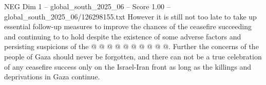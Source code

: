 \begin{textsample}{NEG Dim 1 – global\_south\_2025\_06 – Score 1.00 – global\_south\_2025\_06/126298155.txt}
However it is still not too late to take up essential follow-up measures to improve the chances of the ceasefire succeeding and continuing to to hold despite the existence of some adverse factors and persisting suspicions of the @ @ @ @ @ @ @ @ @ @.
Further the concerns of the people of Gaza should never be forgotten, and there can not be a true celebration of any ceasefire success only on the Israel-Iran front as long as the killings and deprivations in Gaza continue.

\end{textsample}
